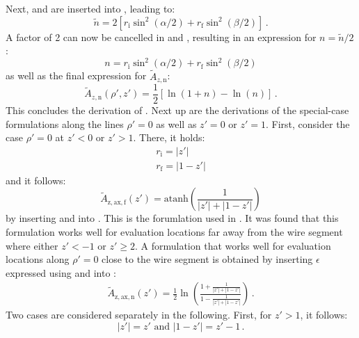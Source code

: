 Next,  and  are inserted into , leading to:
\begin{equation}
  \tilde{n} = 2 \left[ r_\mathrm{i} \sin^2(\alpha/2) + r_\mathrm{f} \sin^2(\beta/2) \right] \label{eqn:n_tilde} \, .
\end{equation}
A factor of 2 can now be cancelled in  and , resulting in an expression for $n = \tilde{n}/2$:
\begin{equation}
  n = r_\mathrm{i} \sin^2(\alpha/2) + r_\mathrm{f} \sin^2(\beta/2)
\end{equation}
as well as the final expression for $\tilde{A}_{z,\mathrm{n}}$:
\begin{equation}
   \tilde{A}_{z,\mathrm{n}} (\rho', z') =  \frac{1}{2} \left[ \ln (1 + n) - \ln (n) \right] \label{eqn:sws_A_z_n_derivation} \, .
\end{equation}
This concludes the derivation of .
Next up are the derivations of the special-case formulations
along the lines $\rho'=0$ as well as $z'=0$ or $z'=1$.
First, consider the case $\rho' = 0$ at $z' < 0$ or $z' > 1$.
There, it holds:
\begin{align}
  r_\mathrm{i} = |z'|     \label{eqn:r_i_v} \\
  r_\mathrm{f} = |1 - z'| \label{eqn:r_f_v}
\end{align}
and it follows:
\begin{equation}
  \tilde{A}_\mathrm{z,ax,f} (z') = \textrm{atanh}\left( \frac{1}{|z'| + |1 - z'|} \right) \label{eqn:sws_A_z_ax_f_derivation}
\end{equation}
by inserting  and  into .
This is the forumlation used in .
It was found that this formulation works well for evaluation locations far away from the wire segment
where either $z' < -1$ or $z' \geq 2$.
A formulation that works well for evaluation locations along $\rho'=0$ close to the wire segment
is obtained by inserting $\epsilon$ expressed using  and  into :
\begin{align}
  \tilde{A}_\mathrm{z,ax,n} (z')
  = \frac{1}{2} \ln \left( \frac{ 1 + \frac{1}{|z'| + |1 - z'|} }{ 1 - \frac{1}{|z'| + |1 - z'|}  } \right) \label{eqn:sws_A_z_ax_n_1} \, .
\end{align}
Two cases are considered separately in the following.
First, for $z' > 1$, it follows:
\begin{equation}
  |z'| = z' \textrm{ and } |1 - z'| = z' - 1 \, .
\end{equation}
